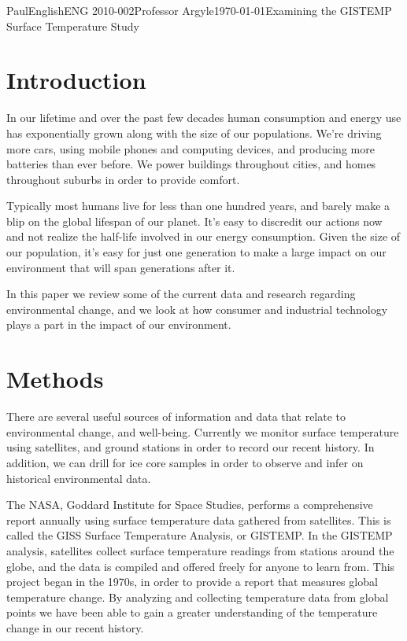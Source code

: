 \documentclass[12pt,letterpaper]{article}
\begin{document}
\begin{mla}{Paul}{English}{ENG 2010-002}{Professor Argyle}{\today}{Examining the GISTEMP Surface Temperature Study}

\section{Introduction}
In our lifetime and over the past few decades human consumption and energy use has exponentially grown along with the size of our populations. We're driving more cars, using mobile phones and computing devices, and producing more batteries than ever before. We power buildings throughout cities, and homes throughout suburbs in order to provide comfort. 

Typically most humans live for less than one hundred years, and barely make a blip on the global lifespan of our planet. It's easy to discredit our actions now and not realize the half-life involved in our energy consumption. Given the size of our population, it's easy for just one generation to make a large impact on our environment that will span generations after it.

In this paper we review some of the current data and research regarding environmental change, and we look at how consumer and industrial technology plays a part in the impact of our environment. 

\section{Methods}
There are several useful sources of information and data that relate to environmental change, and well-being. Currently we monitor surface temperature using satellites, and ground stations in order to record our recent history. In addition, we can drill for ice core samples in order to observe and infer on historical environmental data.

The NASA, Goddard Institute for Space Studies, performs a comprehensive report annually using surface temperature data gathered from satellites. This is called the GISS Surface Temperature Analysis, or GISTEMP. In the GISTEMP analysis, satellites collect surface temperature readings from stations around the globe, and the data is compiled and offered freely for anyone to learn from. This project began in the 1970s, in order to provide a report that measures global temperature change. By analyzing and collecting temperature data from global points we have been able to gain a greater understanding of the temperature change in our recent history.


\end{mla}
\end{document}
